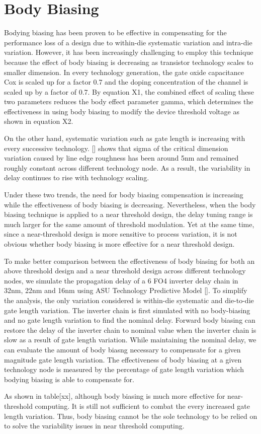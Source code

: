 \section{Body Biasing}

Bodying biasing has been proven to be effective in compensating for the
performance loss of a design due to within-die systematic variation and
intra-die variation. However, it has been increasingly challenging to employ
this technique because the effect of body biasing is decreasing as transistor
technology scales to smaller dimension. In every technology generation, the gate
oxide capacitance Cox is scaled up for a factor 0.7 and the doping concentration
of the channel is scaled up by a factor of 0.7. By equation X1, the combined
effect of scaling these two parameters reduces the body effect parameter gamma,
which determines the effectiveness in using body biasing to modify the device
threshold voltage as shown in equation X2.

On the other hand, systematic variation such as gate length is increasing with
every successive technology. [] shows that sigma of the critical dimension
variation caused by line edge roughness has been around 5nm and remained roughly
constant across different technology node. As a result, the variability in delay
continues to rise with technology scaling. 

Under these two trends, the need for body biasing compensation is increasing
while the effectiveness of body biasing is decreasing. Nevertheless, when the
body biasing technique is applied to a near threshold design, the delay tuning
range is much larger for the same amount of threshold modulation. Yet at the
same time, since a near-threshold design is more sensitive to process variation,
it is not obvious whether body biasing is more effective for a near threshold
design. 

To make better comparison between the effectiveness of body biasing for both an
above threshold design and a near threshold design across different technology
nodes,  we simulate the propagation  delay of a 6 FO4 inverter delay chain in
32nm, 22nm and 16nm using ASU Technology Predictive Model []. To simplify the
analysis, the only variation considered is within-die systematic and die-to-die
gate length variation. The inverter chain is first simulated with no
body-biasing and no gate length variation to find the nominal delay. Forward
body biasing can restore the delay of the inverter chain to nominal value when
the inverter chain is slow as a result of gate length variation. While
maintaining the nominal delay, we can evaluate the amount of body biasng
necessary to compensate for a given magnitude gate length variation. The
effectiveness of body biasing at a given technology node is measured by the
percentage of gate length variation which bodying biasing is able to compensate
for. 

As shown in table[xx], although body biasing is much more effective for
near-threshold computing. It is still not sufficient to combat the every
increased gate length variation. Thus, body biasing cannot be the sole
technology to be relied on to solve the variability issues in near threshold
computing. 

